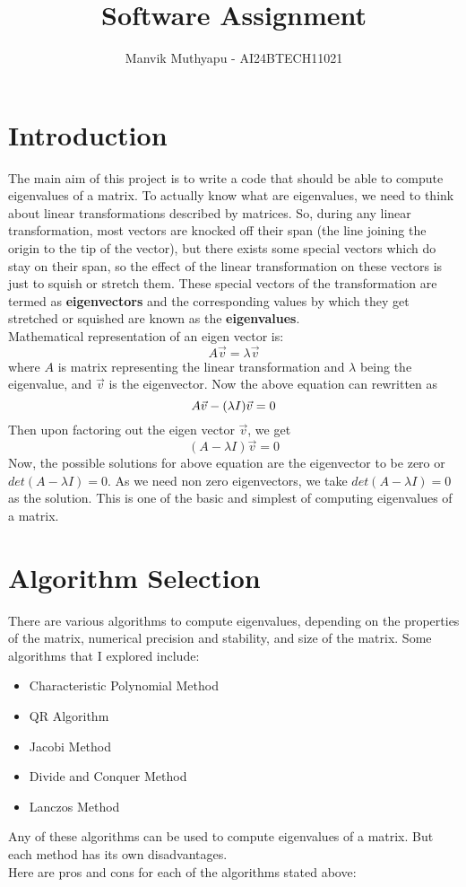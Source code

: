 \documentclass[a4paper, 14pt]{article}
\title{\textbf{Software Assignment}}
\author{Manvik Muthyapu - AI24BTECH11021}
\date{}  %
\begin{document}
\maketitle

\section*{Introduction}

The main aim of this project is to write a code that should be able to compute eigenvalues of a matrix. To actually know what are eigenvalues, we need to think about linear transformations described by matrices. So, during any linear transformation, most vectors are knocked off their span (the line joining the origin to the tip of the vector), but there exists some special vectors which do stay on their span, so the effect of the linear transformation on these vectors is just to squish or stretch them. These special vectors of the transformation are termed as \textbf{eigenvectors} and the corresponding values by which they get stretched or squished are known as the \textbf{eigenvalues}.\\
Mathematical representation of an eigen vector is:
$$A\Vec{v} = \lambda\Vec{v}$$
where $A$ is matrix representing the linear transformation and $\lambda$ being the eigenvalue, and $\Vec{v}$ is the eigenvector. Now the above equation can rewritten as
$$A\Vec{v} - (\lambda I) \Vec{v} = 0\\$$
Then upon factoring out the eigen vector $\Vec{v}$, we get 
$$(A - \lambda I)\Vec{v} = 0$$
Now, the possible solutions for above equation are the eigenvector to be zero or $det(A - \lambda I) = 0$. As we need non zero eigenvectors, we take $det(A - \lambda I) = 0$ as the solution. This is one of the basic and simplest of computing eigenvalues of a matrix.

\section*{Algorithm Selection}
There are various algorithms to compute eigenvalues, depending on the properties of the matrix, numerical precision and stability, and size of the matrix.
Some algorithms that I explored include:

\begin{itemize}
    \item Characteristic Polynomial Method
    \item QR Algorithm
    \item Jacobi Method
    \item Divide and Conquer Method
    \item Lanczos Method
\end{itemize}
Any of these algorithms can be used to compute eigenvalues of a matrix. But each method has its own disadvantages.\\
Here are pros and cons for each of the algorithms stated above:\\
\end{document}
